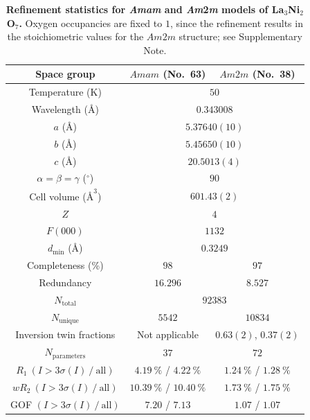 \documentclass[aps,12pt,floatfix,longbibliography,a4paper]{revtex4-2}
\newcommand{\LNO}{La$_3$Ni$_2$O$_7$}
\begin{document}
\clearpage
\newpage
\begin{table}[ht]
\centering
\caption{\textbf{Refinement statistics for \textit{Amam} and \textit{Am}2\textit{m} models of \LNO{}.} Oxygen occupancies are fixed to $1$, since the refinement results in the stoichiometric values for the $Am2m$ structure; see Supplementary Note.}
\label{Tab:refinement}
\setlength{\tabcolsep}{6pt}
\begin{tabular}{c c c}
\hline
Space group & $Amam$ (No.~63) & $Am2m$ (No.~38)\\
\hline
Temperature (K) & \multicolumn{2}{c}{$50$} \\
Wavelength ($\text{\AA}$) & \multicolumn{2}{c}{$0.343008$} \\
$a$ ($\text{\AA}$) & \multicolumn{2}{c}{$5.37640(10)$} \\
$b$ ($\text{\AA}$) & \multicolumn{2}{c}{$5.45650(10)$} \\
$c$ ($\text{\AA}$) & \multicolumn{2}{c}{$20.5013(4)$} \\
$\alpha = \beta = \gamma$ ($^\circ$) & \multicolumn{2}{c}{$90$} \\
Cell volume ($\text{\AA}^{3}$) & \multicolumn{2}{c}{$601.43(2)$} \\
$Z$ & \multicolumn{2}{c}{$4$} \\
$F(000)$ & \multicolumn{2}{c}{$1132$} \\
$d_\text{min}$ (\AA) & \multicolumn{2}{c}{$0.3249$} \\
Completeness (\%) & $98$ & $97$ \\
Redundancy & $16.296$ & $8.527$ \\
$N_\mathrm{total}$ & \multicolumn{2}{c}{$92383$} \\
$N_\mathrm{unique}$ & $5542$ & $10834$ \\
\hline
Inversion twin fractions & Not applicable & $0.63(2)$, $0.37(2)$ \\
$N_\mathrm{parameters}$ & $37$ & $72$ \\
$R_1\ (I>3\sigma(I)\ /\ \text{all})$ & $4.19\ \%$ / $4.22\ \%$ & $1.24\ \%$ / $1.28\ \%$ \\
$wR_2\ (I>3\sigma(I)\ /\ \text{all})$ & $10.39\ \%$ / $10.40\ \%$ & $1.73\ \%$ / $1.75\ \%$ \\
GOF $(I>3\sigma(I)\ /\ \text{all})$ & $7.20$ / $7.13$ & $1.07$ / $1.07$ \\
\hline
\end{tabular}
\end{table}

\clearpage
\newpage
\end{document}
